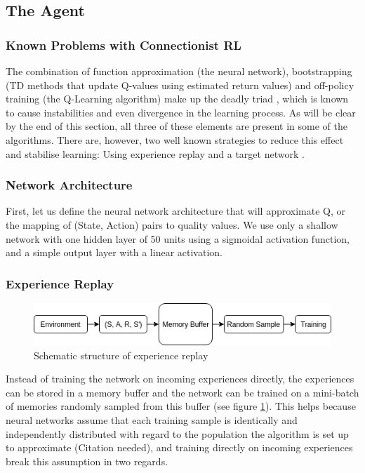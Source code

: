 \subsection{The Agent}\label{sec:agent}


\subsubsection{Known Problems with Connectionist RL}\label{sec:problems}
The combination of function approximation (the neural network), bootstrapping (TD methods that update Q-values using estimated return values) and off-policy training (the Q-Learning algorithm) make up the deadly triad \citep{sutton_barto_2018}, which is known to cause instabilities and even divergence in the learning process. As will be clear by the end of this section, all three of these elements are present in some of the algorithms. There are, however, two well known strategies to reduce this effect and stabilise learning: Using experience replay and a target network \citep{mnih2015human}.

\subsubsection{Network Architecture}\label{sec:architecture}
First, let us define the neural network architecture that will approximate Q, or the mapping of (State, Action) pairs to quality values. We use only a shallow network with one hidden layer of 50 units using a sigmoidal activation function, and a simple output layer with a linear activation.

\subsubsection{Experience Replay}\label{sec:exp_replay}

\begin{figure}[h]
    \centering
    \includegraphics[width=1\linewidth]{img/Experience_Replay.png}
    \caption{Schematic structure of experience replay}
    \label{fig:expreplay}
\end{figure}

Instead of training the network on incoming experiences directly, the experiences can be stored in a memory buffer and the network can be trained on a mini-batch of memories randomly sampled from this buffer (see figure \ref{fig:expreplay}). This helps because neural networks assume that each training sample is identically and independently distributed with regard to the population the algorithm is set up to approximate (Citation needed), and training directly on incoming experiences break this assumption in two regards.

